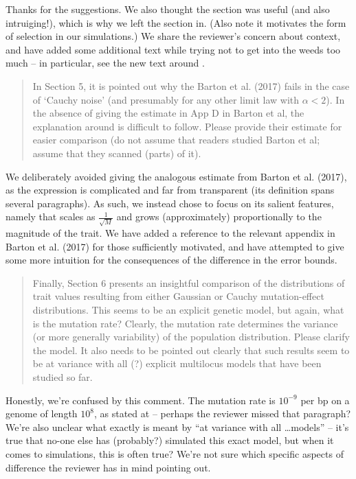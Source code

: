 Thanks for the suggestions.
We also thought the section was useful (and also intruiging!),
which is why we left the section in.
(Also note it motivates the form of selection in our simulations.)
We share the reviewer's concern about context,
and have added some additional text
while trying not to get into the weeds too much
-- in particular, see the new text around .

\begin{quote}
In Section 5, it is pointed out why the Barton et al. (2017) fails in the case of ‘Cauchy
noise’ (and presumably for any other limit law with $\alpha < 2$). In the absence of giving the
estimate in App D in Barton et al, the explanation around  is difficult to
follow. Please provide their estimate for easier comparison (do not assume that readers
studied Barton et al; assume that they scanned (parts) of it).
\end{quote}

We deliberately avoided giving the analogous estimate from Barton et al. (2017), as the expression is complicated and far from transparent (its definition spans several paragraphs). As such, we instead chose to focus on its salient features, namely that scales as $\frac{1}{\sqrt{M}}$ and grows (approximately) proportionally to the magnitude of the trait.  We have added a reference to the relevant appendix in Barton et al. (2017) for those sufficiently motivated, and have attempted to give some more intuition for the consequences of the difference in the error bounds.

\begin{quote}
Finally, Section 6 presents an insightful comparison of the distributions of trait values
resulting from either Gaussian or Cauchy mutation-effect distributions. This seems to be
an explicit genetic model, but again, what is the mutation rate? Clearly, the mutation
rate determines the variance (or more generally variability) of the population distribution.
Please clarify the model. It also needs to be pointed out clearly that such results seem to
be at variance with all (?) explicit multilocus models that have been studied so far.
\end{quote}

Honestly, we're confused by this comment.
The mutation rate is $10^{-9}$ per bp on a genome of length $10^8$,
as stated at  -- perhaps the reviewer missed that paragraph?
We're also unclear what exactly is meant by ``at variance with all \ldots models'' --
it's true that no-one else has (probably?) simulated this exact model,
but when it comes to simulations, this is often true?
We're not sure which specific aspects of difference the reviewer has in mind pointing out.

